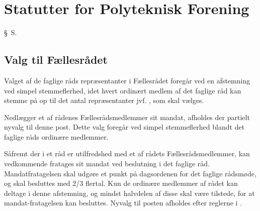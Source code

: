 \setcounter{section}{19}
\setcounter{subsection}{0}
\section*{Statutter for Polyteknisk Forening}

\begin{list}
{\S\ S.}{}
    \setlength{\labelwidth}{.5in}%
    \setlength{\leftmargin}{.25in} %

\subsection{Valg til Fællesrådet}
\label{kap:valgtilfaellesraad}

\item \label{S:FR:valgtilFR} Valget af de faglige råds repræsentanter i Fællesrådet foregår ved en afstemning ved simpel stemmeflerhed, idet hvert ordinært medlem af det faglige råd kan stemme på op til det antal repræsentanter jvf. , som skal vælges.

\item \label{S:FR:nyvalgFR} Nedlægger et af rådenes Fællesrådsmedlemmer sit mandat, afholdes der partielt nyvalg til denne post. Dette valg foregår ved simpel stemmeflerhed blandt det faglige råds ordinære medlemmer.

\item \label{S:FR:omvalgFR} Såfremt der i et råd er utilfredshed med et af rådets Fællesrådsmedlemmer, kan vedkommende fratages sit mandat ved beslutning i det faglige råd. Mandatfratagelsen skal udgøre et punkt på dagsordenen for det faglige rådsmøde, og skal besluttes med 2/3 flertal. Kun de ordinære medlemmer af rådet kan deltage i denne afstemning, og mindst halvdelen af disse skal være tilstede, for at mandat-fratagelsen kan besluttes. Nyvalg til posten afholdes efter reglerne i  .




\end{list}
